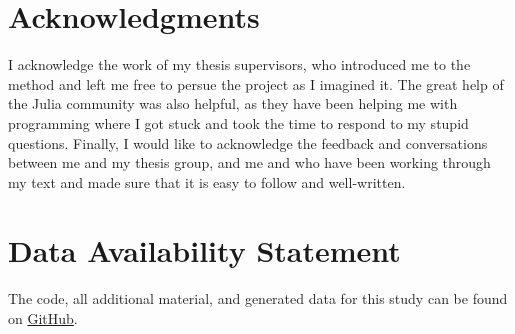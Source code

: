 \documentclass[utf8]{FrontiersinVancouver}
\begin{document}
\section*{Acknowledgments}
I acknowledge the work of my thesis supervisors, who introduced me to the method and left me free to persue the project as I imagined it. The great help of the Julia community was also helpful, as they have been helping me with programming where I got stuck and took the time to respond to my stupid questions. Finally, I would like to acknowledge the feedback and conversations between me and my thesis group, and me and  who have been working through my text and made sure that it is easy to follow and well-written.

\section*{Data Availability Statement}
The code, all additional material, and generated data for this study can be found on \href{https://github.com/MvanSteenbergen/MasterThesisRQA}{GitHub}.









\end{document}
